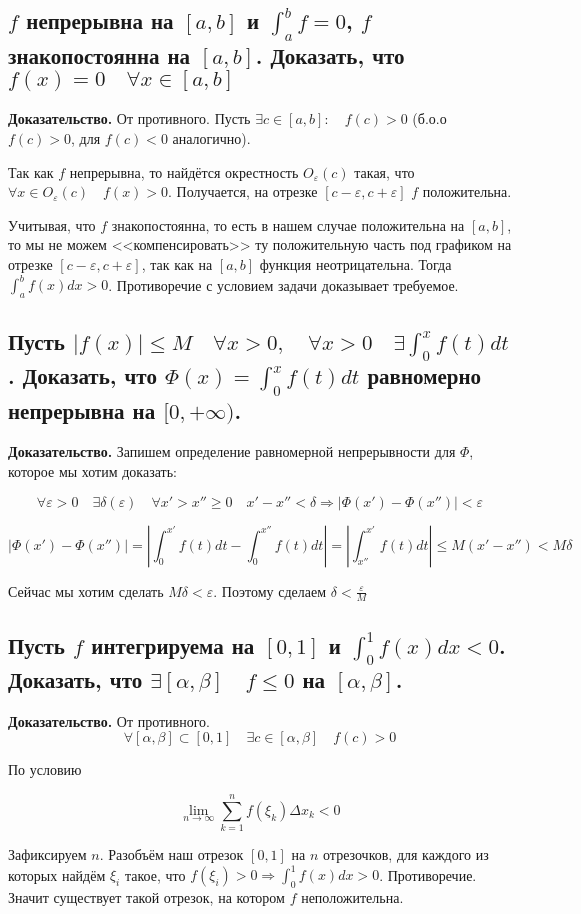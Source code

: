 \documentclass[a4paper]{article}
\begin{document}
\subsection{$f$ непрерывна на $[a,b]$ и $\int_a^b f = 0$, $f$ знакопостоянна на $[a,b]$. Доказать, что $f(x)=0 \quad \forall x \in [a,b]$}

\textbf{Доказательство.} От противного. Пусть $\exists c \in [a,b]: \quad f(c)>0$ (б.о.о $f(c)>0$, для $f(c) < 0$ аналогично).

Так как $f$ непрерывна, то найдётся окрестность $O_{\varepsilon}(c)$ такая, что $\forall x \in O_{\varepsilon}(c) \quad f(x) > 0$. Получается, на отрезке $[c-\varepsilon, c+\varepsilon]$ $f$ положительна. 

Учитывая, что $f$ знакопостоянна, то есть в нашем случае положительна на $[a,b]$, то мы не можем <<компенсировать>> ту положительную часть под графиком на отрезке $[c-\varepsilon, c+\varepsilon]$, так как на $[a,b]$ функция неотрицательна. Тогда $\int_a^b f(x)dx > 0$. Противоречие с условием задачи доказывает требуемое.

\subsection{Пусть $|f(x)| \leq M \quad \forall x > 0, \quad \forall x > 0 \quad \exists \int_0^x f(t)dt$. Доказать, что $\Phi(x) = \int_0^x f(t)dt$ равномерно непрерывна на $[0, +\infty)$.}

\textbf{Доказательство.}
Запишем определение равномерной непрерывности для $\Phi$, которое мы хотим доказать:

\[
\forall \varepsilon > 0 \quad \exists \delta(\varepsilon) \quad \forall x' > x'' \geq 0 \quad x'-x''<\delta \Rightarrow |\Phi(x') - \Phi(x'')| < \varepsilon
\]

\[
|\Phi(x') - \Phi(x'')| = \left| \int_0^{x'} f(t)dt - \int_0^{x''} f(t)dt \right| = \left| \int_{x''}^{x'} f(t)dt \right| \leq M(x'-x'') < M\delta 
\]

Сейчас мы хотим сделать $M\delta < \varepsilon$. Поэтому сделаем $\delta < \frac{\varepsilon}{M}$

\subsection{Пусть $f$ интегрируема на $[0,1]$ и $\int_0^1 f(x)dx < 0$. Доказать, что $\exists [\alpha, \beta] \quad f \leq 0$ на $[\alpha, \beta]$.}

\textbf{Доказательство.} От противного. 
\[ \forall [\alpha, \beta] \subset [0,1] \quad \exists c \in [\alpha, \beta] \quad f(c) > 0\]

По условию 

\[ \lim_{n \rightarrow \infty} \sum_{k=1}^n f(\xi_k) \Delta x_k < 0
\]

Зафиксируем $n$. Разобъём наш отрезок $[0,1]$ на $n$ отрезочков, для каждого из которых найдём $\xi_i$ такое, что $f(\xi_i) > 0 \Rightarrow \int_0^1 f(x)dx > 0$. Противоречие. Значит существует такой отрезок, на котором $f$ неположительна.
\end{document}
